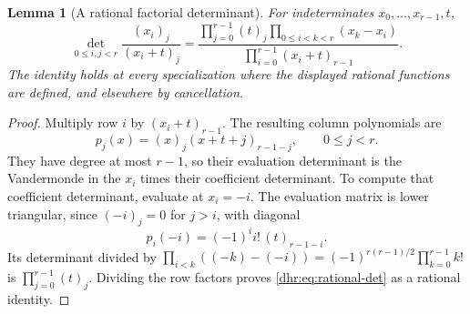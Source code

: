 \documentclass[11pt,letterpaper]{article}
\numberwithin{equation}{section}
\newtheorem{lemma}[theorem]{Lemma}
\theoremstyle{definition}\newtheorem{definition}[theorem]{Definition}
\theoremstyle{remark}\newtheorem{remark}[theorem]{Remark}
\begin{document}
\begin{lemma}[A rational factorial determinant]\label{dhr:lem:rational-det}
For indeterminates $x_0,\ldots,x_{r-1},t$,
\begin{equation}\label{dhr:eq:rational-det}
 \det_{0\leq i,j<r}\frac{(x_i)_j}{(x_i+t)_j}
 =\frac{\displaystyle\prod_{j=0}^{r-1}(t)_j
                   \prod_{0\leq i<k<r}(x_k-x_i)}
        {\displaystyle\prod_{i=0}^{r-1}(x_i+t)_{r-1}}.
\end{equation}
The identity holds at every specialization where the displayed
rational functions are defined, and elsewhere by cancellation.
\end{lemma}
\begin{proof}
Multiply row $i$ by $(x_i+t)_{r-1}$. The resulting column polynomials
are
\[
 p_j(x)=(x)_j(x+t+j)_{r-1-j},\qquad 0\leq j<r.
\]
They have degree at most $r-1$, so their evaluation determinant is
the Vandermonde in the $x_i$ times their coefficient determinant.
To compute that coefficient determinant, evaluate at $x_i=-i$.
The evaluation matrix is lower triangular, since $(-i)_j=0$ for
$j>i$, with diagonal
\[
 p_i(-i)=(-1)^i i!\,(t)_{r-1-i}.
\]
Its determinant divided by
$\prod_{i<k}((-k)-(-i))=(-1)^{r(r-1)/2}\prod_{k=0}^{r-1}k!$
is $\prod_{j=0}^{r-1}(t)_j$. Dividing the row factors proves
\eqref{dhr:eq:rational-det} as a rational identity.
\end{proof}
\end{document}
